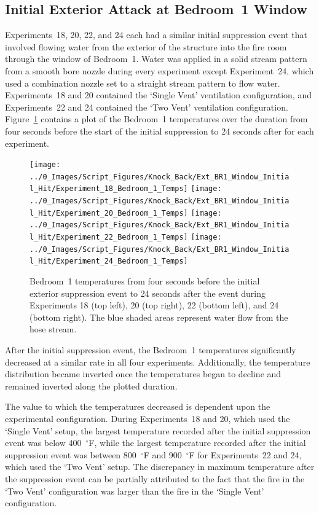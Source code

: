 \documentclass[12pt,oneside]{book}
\begin{document}
\FloatBarrier

\subsection{Initial Exterior Attack at Bedroom~1 Window}
Experiments~18, 20, 22, and 24 each had a similar initial suppression event that involved flowing water from the exterior of the structure into the fire room through the window of Bedroom~1. Water was applied in a solid stream pattern from a smooth bore nozzle during every experiment except Experiment~24, which used a combination nozzle set to a straight stream pattern to flow water. Experiments~18 and 20 contained the `Single Vent' ventilation configuration, and Experiments~22 and 24 contained the `Two Vent' ventilation configuration. Figure~\ref{fig:knockback_ext_1} contains a plot of the Bedroom~1 temperatures over the duration from four seconds before the start of the initial suppression to 24 seconds after for each experiment.

\begin{figure}[H]
	\centering
	\texttt{[image: ../0\_Images/Script\_Figures/Knock\_Back/Ext\_BR1\_Window\_Initial\_Hit/Experiment\_18\_Bedroom\_1\_Temps]}
	\texttt{[image: ../0\_Images/Script\_Figures/Knock\_Back/Ext\_BR1\_Window\_Initial\_Hit/Experiment\_20\_Bedroom\_1\_Temps]}
	\texttt{[image: ../0\_Images/Script\_Figures/Knock\_Back/Ext\_BR1\_Window\_Initial\_Hit/Experiment\_22\_Bedroom\_1\_Temps]}
	\texttt{[image: ../0\_Images/Script\_Figures/Knock\_Back/Ext\_BR1\_Window\_Initial\_Hit/Experiment\_24\_Bedroom\_1\_Temps]}
	\caption[Initial Exterior Attack --- Bedroom~1 Temperatures]{Bedroom~1 temperatures from four seconds before the initial exterior suppression event to 24 seconds after the event during Experiments 18 (top left), 20 (top right), 22 (bottom left), and 24 (bottom right). The blue shaded areas represent water flow from the hose stream.}
	\label{fig:knockback_ext_1}
\end{figure}

After the initial suppression event, the Bedroom~1 temperatures significantly decreased at a similar rate in all four experiments. Additionally, the temperature distribution became inverted once the temperatures began to decline and remained inverted along the plotted duration. 

The value to which the temperatures decreased is dependent upon the experimental configuration. During Experiments~18 and 20, which used the `Single Vent' setup, the largest temperature recorded after the initial suppression event was below 400~$^\circ$F, while the largest temperature recorded after the initial suppression event was between 800~$^\circ$F and 900~$^\circ$F for Experiments~22 and 24, which used the `Two Vent' setup. The discrepancy in maximum temperature after the suppression event can be partially attributed to the fact that the fire in the `Two Vent' configuration was larger than the fire in the `Single Vent' configuration. 
\end{document}
